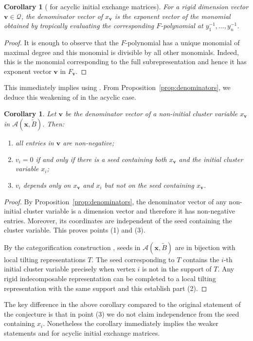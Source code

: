 \documentclass[12pt]{amsart}
\newtheorem{corollary}[theorem]{Corollary}
\newcommand{\bfv}{\mathbf{v}}
\newcommand{\bfx}{\mathbf{x}}
\newcommand{\cA}{\mathcal{A}}
\newcommand{\cQ}{\mathcal{Q}}
\begin{document}
  \begin{corollary}[{\cite[Conjecture 7.17]{fomin-zelevinsky4} for acyclic initial exchange matrices}]
    For a rigid dimension vector $\bfv\in\cQ$, the denominator vector of $x_\bfv$ is the exponent vector of the monomial obtained by tropically evaluating the corresponding $F$-polynomial at $y_1^{-1},\dots,y_n^{-1}$.
  \end{corollary}
  \begin{proof}
    It is enough to observe that the $F$-polynomial has a unique monomial of maximal degree and this monomial is divisible by all other monomials.
    Indeed, this is the monomial corresponding to the full subrepresentation and hence it has exponent vector $\bfv$ in $F_\bfv$.
  \end{proof}
  This immediately implies \cite[Conjecture 6.11]{fomin-zelevinsky4} using \cite[Proposition 7.16]{fomin-zelevinsky4}.  
  From Proposition~\ref{prop:denominators}, we deduce this weakening of \cite[Conjecture 7.4]{fomin-zelevinsky4} in the acyclic case.
  \begin{corollary}
    \label{cor:sign_coherence}
    Let $\bfv$ be the denominator vector of a non-initial cluster variable $x_\bfv$ in $\cA(\bfx,\widetilde{B})$.
    Then:
    \begin{enumerate}
      \item
        all entries in $\bfv$ are non-negative;
        
      \item
        $v_i=0$ if and only if there is a seed containing both $x_\bfv$ and the initial cluster variable $x_i$;

      \item
        $v_i$ depends only on $x_\bfv$ and $x_i$ but not on the seed containing $x_\bfv$.
    \end{enumerate}
  \end{corollary}
  \begin{proof}
    By Proposition~\ref{prop:denominators}, the denominator vector of any non-initial cluster variable is a dimension vector and therefore it has non-negative entries.
    Moreover, its coordinates are independent of the seed containing the cluster variable. 
    This proves points (1) and (3).

    By the categorification construction \cite{rupel2}, seeds in $\cA(\bfx,\widetilde{B})$ are in bijection with local tilting representations $T$.
    The seed corresponding to $T$ contains the $i$-th initial cluster variable precisely when vertex $i$ is not in the support of $T$.
    Any rigid indecomposable representation can be completed to a local tilting representation with the same support and this establish part (2).
  \end{proof}
  The key difference in the above corollary compared to the original statement of the conjecture is that in point (3) we do not claim independence from the seed containing $x_i$.
  Nonetheless the corollary immediately implies the weaker statements \cite[Conjecture 7.5]{fomin-zelevinsky4} and \cite[Conjecture~2.9]{reading-stella} for acyclic initial exchange matrices.
\end{document}

